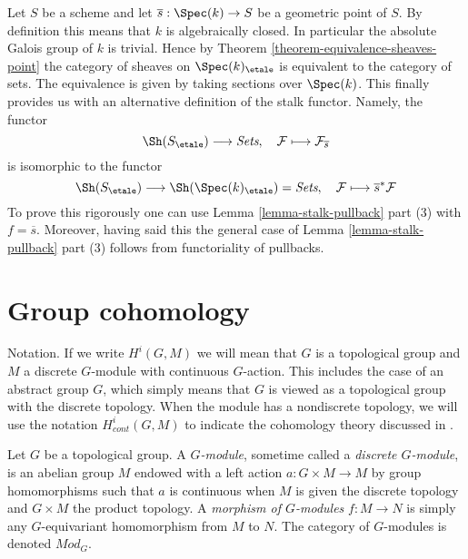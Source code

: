 \begin{remark}
\label{remark-stalk-pullback}
Let $S$ be a scheme and let $\overline{s} : \Spec(k) \to S$
be a geometric point of $S$. By definition this means that $k$
is algebraically closed. In particular the absolute Galois group of $k$
is trivial. Hence by
Theorem \ref{theorem-equivalence-sheaves-point}
the category of sheaves on $\Spec(k)_\etale$ is equivalent
to the category of sets. The equivalence is given by taking
sections over $\Spec(k)$. This finally provides us with an
alternative definition of the stalk functor. Namely, the functor
$$
\Sh(S_\etale) \longrightarrow \textit{Sets}, \quad
\mathcal{F} \longmapsto \mathcal{F}_{\overline{s}}
$$
is isomorphic to the functor
$$
\Sh(S_\etale)
\longrightarrow
\Sh(\Spec(k)_\etale) = \textit{Sets},
\quad
\mathcal{F} \longmapsto \overline{s}^*\mathcal{F}
$$
To prove this rigorously one can use
Lemma \ref{lemma-stalk-pullback} part (3)
with $f = \overline{s}$. Moreover, having said this the general case of
Lemma \ref{lemma-stalk-pullback} part (3)
follows from functoriality of pullbacks.
\end{remark}






\section{Group cohomology}
\label{section-group-cohomology}

\noindent
Notation. If we write $H^i(G, M)$ we will mean that $G$ is a topological group
and $M$ a discrete $G$-module with continuous $G$-action. This includes
the case of an abstract group $G$, which simply means that $G$ is viewed
as a topological group with the discrete topology. When the module has a
nondiscrete topology, we will use the notation $H^i_{cont}(G, M)$ to
indicate the cohomology theory discussed in \cite{Tate}.

\begin{definition}
\label{definition-G-module-continuous}
Let $G$ be a topological group.
A {\it $G$-module}, sometime called a {\it discrete $G$-module},
is an abelian group $M$ endowed with a left action $a : G \times M \to M$
by group homomorphisms such that $a$ is continuous when $M$ is given the
discrete topology and $G \times M$ the product topology.
A {\it morphism of $G$-modules} $f : M \to N$ is simply any $G$-equivariant
homomorphism from $M$ to $N$.
The category of $G$-modules is denoted {\it $\textit{Mod}_G$}.
\end{definition}

